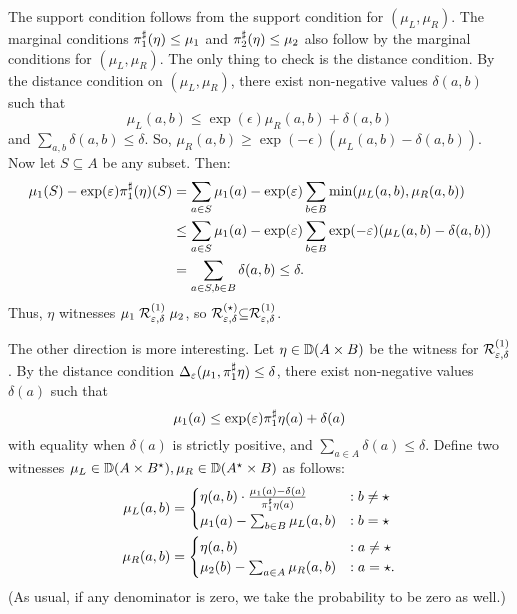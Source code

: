 \documentclass{lmcs}
\begin{document}
  The support condition follows from the support condition for $(\mu_L, \mu_R)$.
  The marginal conditions $\pi_{1}^{\sharp}(\eta) \leq \mu_1$ and $\pi_{2}^{\sharp}(\eta) \leq \mu_2$
  also follow by the marginal conditions for $(\mu_L, \mu_R)$. The only thing to
  check is the distance condition. By the distance condition on $(\mu_L,
  \mu_R)$, there exist non-negative values $\delta(a, b)$ such that
  \[
    \mu_L(a, b) \leq \exp(\epsilon) \mu_R(a, b) + \delta(a, b)
  \]
  and $\sum_{a, b} \delta(a,b) \leq \delta$. So, $\mu_R(a, b) \geq
  \exp(-\epsilon) (\mu_L(a, b) - \delta(a, b))$.  Now let $S \subseteq A$ be
  any subset. Then:
  \begin{align*}
    \mu_1(S) - \exp(\varepsilon) \pi_{1}^{\sharp}(\eta)(S)
    &= \sum_{a \in S} \mu_1(a) - \exp(\varepsilon) \sum_{b \in B} \min(\mu_L(a, b), \mu_R(a, b)) \\
    &\leq \sum_{a \in S} \mu_1(a) - \exp(\varepsilon)
    \sum_{b \in B} \exp(-\varepsilon) (\mu_L(a, b) - \delta(a, b)) \\
    &= \sum_{a \in S, b \in B} \delta(a, b) \leq \delta .
  \end{align*}
  Thus, $\eta$ witnesses $\mu_1 \mathrel{\mathrel{\mathcal{R}}^{(1)}_{\varepsilon, \delta}} \mu_2$, so
  $\mathrel{\mathrel{\mathcal{R}}^{(\star)}_{\varepsilon, \delta}} \subseteq \mathrel{\mathrel{\mathcal{R}}^{(1)}_{\varepsilon,
    \delta}}$.

  The other direction is more interesting. Let $\eta \in {\mathbb{D}}(A \times B)$ be
  the witness for $\mathrel{\mathrel{\mathcal{R}}^{(1)}_{\varepsilon, \delta}}$.  By the distance
  condition $\Delta_{\varepsilon}(\mu_1,\pi_{1}^{\sharp} \eta) \leq \delta$, there exist
  non-negative values $\delta(a)$ such that
  \[
    \mu_1(a) \leq \exp(\varepsilon) \pi_{1}^{\sharp} \eta(a) + \delta(a)
  \]
  with equality when $\delta(a)$ is strictly positive, and $\sum_{a \in A}
  \delta(a) \leq \delta$. Define two witnesses $\mu_L \in {\mathbb{D}}(A \times
  B^\star), \mu_R \in {\mathbb{D}}(A^\star \times B)$ as follows:
  \begin{align*}
    \mu_L(a, b) &=
    \begin{cases}
      \eta(a, b) \cdot \frac{\mu_1(a) - \delta(a)}{\pi_{1}^{\sharp}\eta(a)}
      &: b \neq \star \\
      \mu_1(a) - \sum_{b \in B} \mu_L(a, b)
      &: b = \star
    \end{cases}
    \\
    \mu_R(a, b) &=
    \begin{cases}
      \eta(a, b) &: a \neq \star \\
      \mu_2(b) - \sum_{a \in A} \mu_R(a, b)
      &: a = \star .
    \end{cases}
  \end{align*}
  (As usual, if any denominator is zero, we take the probability to be zero as
  well.)
\end{document}
